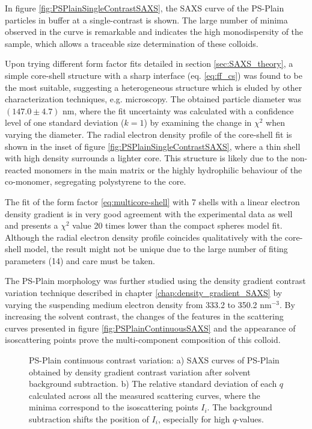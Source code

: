 In figure \ref{fig:PSPlainSingleContrastSAXS}, the SAXS curve of the  PS-Plain particles in buffer at a single-contrast is shown. The large number of minima observed in the curve is remarkable and indicates the high monodispersity of the sample, which allows a traceable size determination of these colloids.

Upon trying different form factor fits detailed in section \ref{sec:SAXS_theory}, a simple core-shell structure with a sharp interface (eq. \ref{eq:ff_cs}) was found to be the most suitable, suggesting a heterogeneous structure which is eluded by other characterization techniques, e.g. microscopy. The obtained particle diameter was $(147.0\pm4.7)$ nm, where the fit uncertainty was calculated with a confidence level of one standard deviation ($k=1$) by examining the change in $\chi^2$ when varying the diameter. The radial electron density profile of the core-shell fit is shown in the inset of figure \ref{fig:PSPlainSingleContrastSAXS}, where a thin shell with high density surrounds a lighter core. This structure is likely due to the non-reacted monomers in the main matrix or the highly hydrophilic behaviour of the co-monomer, segregating polystyrene to the core.

The fit of the form factor \ref{eq:multicore-shell} with 7 shells with a linear electron density gradient is in very good agreement with the experimental data as well and presents a $\chi^2$ value 20 times lower than the compact spheres model fit. Although the radial electron density profile coincides qualitatively with the core-shell model, the result might not be unique due to the large number of fiting parameters (14) and care must be taken.

The PS-Plain morphology was further studied using the density gradient contrast variation technique described in chapter \ref{chap:density_gradient_SAXS} by varying the suspending medium electron density from 333.2 to 350.2 nm$^{-3}$. By increasing the solvent contrast, the changes of the features in the scattering curves presented in figure \ref{fig:PSPlainContinuousSAXS} and the appearance of isoscattering points prove the multi-component composition of this colloid.

\begin{figure}%
	\centering
	\caption[Continuous contrast variation experimental data of the PS-Plain particles.]{PS-Plain continuous contrast variation: a) SAXS curves of PS-Plain obtained by density gradient contrast variation after solvent background subtraction. b) The relative standard deviation of each $q$ calculated across all the measured scattering curves, where the minima correspond to the isoscattering points $I_i$. The background subtraction shifts the position of $I_i$, especially for high $q$-values.}
\end{figure}

